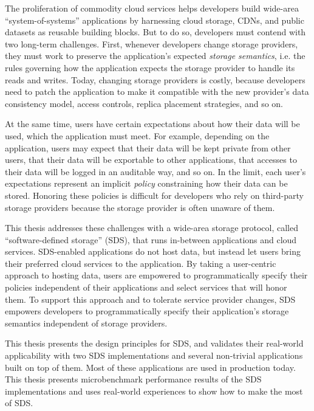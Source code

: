 The proliferation of commodity cloud services helps developers build
wide-area ``system-of-systems'' applications by harnessing
cloud storage, CDNs, and public datasets as reusable building blocks.
But to do so, developers must contend with two
long-term challenges.  First, whenever developers change storage providers, 
they must work to preserve the application's expected \emph{storage
semantics}, i.e. the rules governing how the application expects the
storage provider to handle its reads and writes.  Today, changing
storage providers is costly, because developers need to patch
the application to make it compatible with the new provider's
data consistency model, access controls, replica placement
strategies, and so on.

At the same time, users have certain expectations about how their
data will be used, which the application must meet.
For example, depending on the application, users
may expect that their data will be kept private from other users, that their data will be exportable
to other applications, that accesses to their data will be logged in an auditable way,
and so on.  In the limit, each user's expectations represent an implicit
\emph{policy} constraining how their data can be stored.  Honoring
these policies is difficult for developers who rely on third-party storage
providers because the storage provider is often unaware of them.

This thesis addresses these challenges with a wide-area storage protocol, called ``software-defined
storage'' (SDS), that runs in-between applications and cloud services.
SDS-enabled applications do not host data, but instead let users
bring their preferred cloud services to the application.  By taking a
user-centric approach to hosting data, users are empowered to programmatically
specify their policies independent of their applications and select
services that will honor them.  To support this approach and to
tolerate service provider changes, SDS empowers developers to programmatically
specify their application's storage semantics independent of storage providers.

This thesis presents the design principles for SDS, and validates their
real-world applicability with two SDS implementations and several non-trivial
applications built on top of them.  Most of these applications are used in
production today.  This thesis
presents microbenchmark performance results of the SDS implementations and uses
real-world experiences to show how to make the most of SDS.
